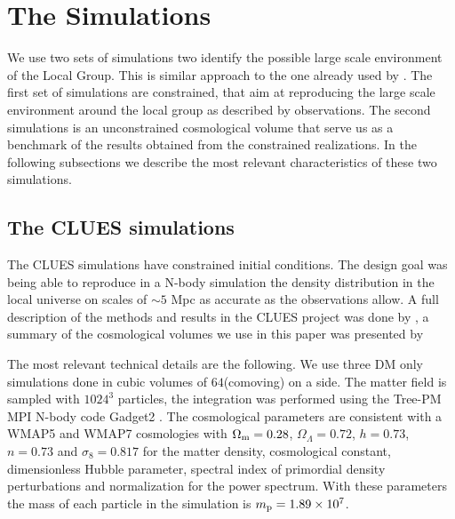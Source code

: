 \documentclass[usenatbib]{latex/mn2e}
\begin{document}
\section{The Simulations}
\label{sec:the_simulations}


We use two sets of simulations two identify the possible large scale 
environment of the Local Group. This is similar approach to the one 
already used by . The first set of simulations are 
constrained, that aim at reproducing the large scale environment around 
the local group as described by observations. The second simulations is an 
unconstrained cosmological volume that serve us as a benchmark of the 
results obtained from the constrained realizations. In the following 
subsections we describe the most relevant characteristics of these two 
simulations.


\subsection{The CLUES simulations}
\label{subsec:CLUES_simulations}


The CLUES simulations have constrained initial conditions. The design goal 
was being able to reproduce in a N-body simulation the density 
distribution in the local universe on scales of $\sim5$ Mpc as accurate as 
the observations allow. A full description of the methods and results in 
the CLUES project was done by , a summary of the 
cosmological volumes we use in this paper was presented by 


The most relevant technical details are the following. We use three DM 
only simulations done in cubic volumes of $64$\hMpc (comoving) on a side. 
The matter field is sampled with $1024^3$ particles, the integration was 
performed using the Tree-PM MPI N-body code Gadget2 . The cosmological parameters are consistent with a WMAP5 and WMAP7 
cosmologies with $\Omega_{\rm m}=0.28$, $\Omega_{\Lambda}=0.72$, $h=0.73$, 
$n=0.73$ and $\sigma_{8}=0.817$  for the 
matter density, cosmological constant, dimensionless Hubble parameter, 
spectral index of primordial density perturbations and normalization for 
the power spectrum. With these parameters the mass of each particle in the 
simulation is $m_{\rm p}=1.89\times 10^{7}$\hMsun.
\end{document}
